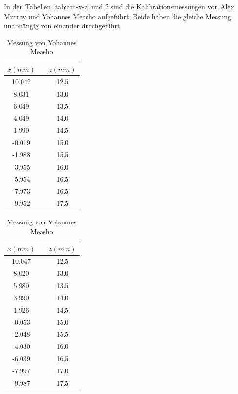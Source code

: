 In    den   Tabellen   \ref{tab:am-x-z}   und    \ref{tab:ym-x-z}    sind    die
Kalibrationsmessungen von Alex Murray  und  Yohannes  Measho aufgef\"uhrt. Beide
haben   die   gleiche   Messung   unabh\"angig  von   einander   durchgef\"uhrt.

\begin{table}[H]
    \caption{Kalibrationsmessdaten}
    \begin{subtable}{.5\linewidth}
        \centering
        \caption{Messung von Alex Murray}
        \label{tab:am-x-z}
        \begin{tabular}{ccc}
            \toprule
            $x (mm)$ & \hspace{5mm} & $z (mm)$ \\
            \midrule
            10.042 && 12.5 \\
            8.031  && 13.0 \\
            6.049  && 13.5 \\
            4.049  && 14.0 \\
            1.990  && 14.5 \\
            -0.019 && 15.0 \\
            -1.988 && 15.5 \\
            -3.955 && 16.0 \\
            -5.954 && 16.5 \\
            -7.973 && 16.5 \\
            -9.952 && 17.5 \\
            \bottomrule
        \end{tabular}
    \end{subtable}%
    \begin{subtable}{.5\linewidth}
        \centering
        \caption{Messung von Yohannes Measho}
        \label{tab:ym-x-z}
        \begin{tabular}{ccc}
            \toprule
            $x (mm)$ & \hspace{5mm} & $z (mm)$ \\
            \midrule
            10.047 && 12.5 \\
            8.020  && 13.0 \\
            5.980  && 13.5 \\
            3.990  && 14.0 \\
            1.926  && 14.5 \\
            -0.053 && 15.0 \\
            -2.048 && 15.5 \\
            -4.030 && 16.0 \\
            -6.039 && 16.5 \\
            -7.997 && 17.0 \\
            -9.987 && 17.5 \\
           \bottomrule
        \end{tabular}
    \end{subtable}
\end{table}



